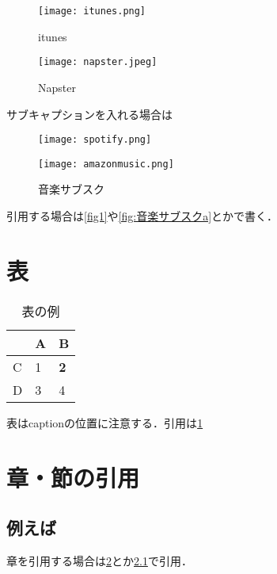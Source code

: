 \documentclass[main.tex]{subfiles}
\begin{document}
\begin{figure}[h]
    \begin{minipage}[h]{0.45\linewidth}
        \centering
        \texttt{[image: itunes.png]}
        \caption{itunes}
        \label{fig:itunes}
    \end{minipage}
    \begin{minipage}[h]{0.45\linewidth}
        \centering
        \texttt{[image: napster.jpeg]}
        \caption{Napster}
        \label{fig:napster}
    \end{minipage}
\end{figure}

サブキャプションを入れる場合は

\begin{figure}[h]
    \begin{minipage}[h]{0.45\linewidth}
        \centering
        \texttt{[image: spotify.png]}
        \label{fig:音楽サブスクa}
    \end{minipage}
    \begin{minipage}[h]{0.45\linewidth}
        \centering
        \texttt{[image: amazonmusic.png]}
        \label{fig:音楽サブスクb}
    \end{minipage}
    \caption{音楽サブスク}
    \label{fig:音楽サブスク}
\end{figure}

引用する場合は\cref{fig1}や\cref{fig:音楽サブスクa}とかで書く．

\clearpage


\section{表}
\begin{table}[h]
    \centering
    \caption{表の例}
    \begin{tabular}{|l|l|l|}
    \hline
      & A & B          \\ \hline
    C & 1 & \textbf{2} \\ \hline
    D & 3 & 4          \\ \hline
    \end{tabular}
    \label{tab:表の例}
\end{table}

表はcaptionの位置に注意する．引用は\cref{tab:表の例}


\section{章・節の引用}
\label{sho}
\subsection{例えば}
\label{exam}
章を引用する場合は\cref{sho}とか\cref{exam}で引用．
\end{document}
